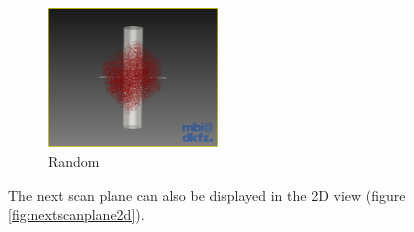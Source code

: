 \begin{figure}[H]
  \centering
  \includegraphics[width=0.4\textwidth]{images/next_scan_plane/random.png}
  \caption{Random}\label{fig:nextscanplanerandom}
\end{figure}

The next scan plane can also be displayed in the 2D view (figure \ref{fig:nextscanplane2d}).

